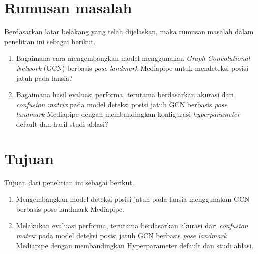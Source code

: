 \section{Rumusan masalah} \label{I.Rumusan Masalah}
Berdasarkan latar belakang yang telah dijelaskan, maka rumusan masalah dalam penelitian ini sebagai berikut.
\begin{enumerate}[noitemsep]
    \item Bagaimana cara mengembangkan model menggunakan \textit{Graph Convolutional Network} (GCN) berbasis \textit{pose landmark} Mediapipe untuk mendeteksi posisi jatuh pada lansia?
    \item Bagaimana hasil evaluasi performa, terutama berdasarkan akurasi dari \textit{confusion matrix} pada model deteksi posisi jatuh GCN berbasis \textit{pose landmark} Mediapipe dengan membandingkan konfigurasi \textit{hyperparameter} default dan hasil studi ablasi?
\end{enumerate}


\section{Tujuan} \label{I.Tujuan}
Tujuan dari penelitian ini sebagai berikut.
\begin{enumerate}[noitemsep]
    \item Mengembangkan model deteksi posisi jatuh pada lansia menggunakan GCN berbasis pose landmark Mediapipe.
    \item Melakukan evaluasi performa, terutama berdasarkan akurasi dari \textit{confusion matrix} pada model deteksi posisi jatuh GCN berbasis \textit{pose landmark} Mediapipe dengan membandingkan Hyperparameter default dan studi ablasi.
\end{enumerate}

